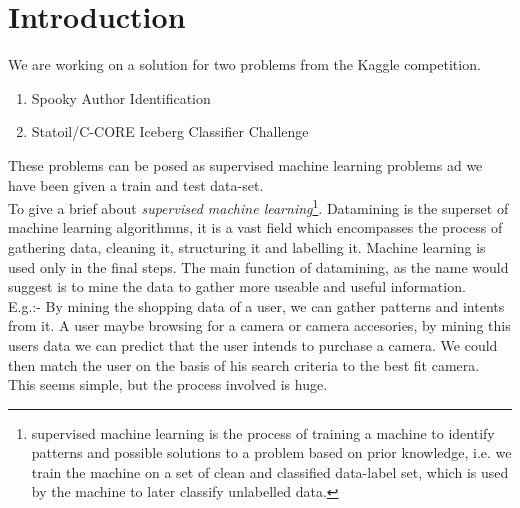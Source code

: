 \documentclass[fleqn,10pt]{SelfArx} %
\affiliation{\textsuperscript{1}\textit{Data Science, School of Informatics, Computing, and Engineering, Indiana University, Bloomington, IN, USA}} %
\begin{document}
\renewcommand{\abstractname}{}  
\renewcommand{\absnamepos}{} 

\flushbottom %
\maketitle %
\tableofcontents %
\thispagestyle{empty} %


\section{Introduction}
We are working on a solution for two problems from the Kaggle competition.
\begin{enumerate}
	\item Spooky Author Identification
	\item Statoil/C-CORE Iceberg Classifier Challenge
\end{enumerate}
These problems can be posed as supervised machine learning problems ad we have been given a train and test data-set.\\
To give a brief about \textit{supervised machine learning}\footnote{supervised machine learning is the process of training a machine to identify patterns and possible solutions to a problem based on prior knowledge, i.e. we train the machine on a set of clean and classified data-label set, which is used by the machine to later classify unlabelled data.}.
Datamining is the superset of machine learning algorithmns, it is a vast field which encompasses the process of gathering data, cleaning it, structuring it and labelling it. Machine learning is used only in the final steps. The main function of datamining, as the name would suggest is to mine the data to gather more useable and useful information.\\
E.g.:- By mining the shopping data of a user, we can gather patterns and intents from it. A user maybe browsing for a camera or camera accesories, by mining this users data we can predict that the user intends to purchase a camera. We could then match the user on the basis of his search criteria to the best fit camera.\\
This seems simple, but the process involved is huge.
\end{document}
